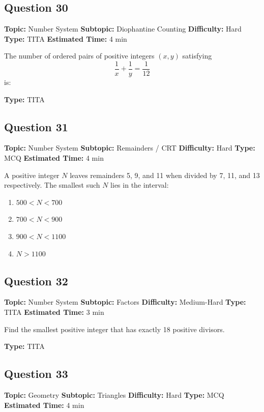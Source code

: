 \documentclass[11pt]{article}
\begin{document}
\subsection*{Question 30}
\textbf{Topic:} Number System \quad \textbf{Subtopic:} Diophantine Counting \quad \textbf{Difficulty:} Hard \quad \textbf{Type:} TITA \quad \textbf{Estimated Time:} 4 min

\begin{tcolorbox}
The number of ordered pairs of positive integers $(x, y)$ satisfying
\[ \frac{1}{x} + \frac{1}{y} = \frac{1}{12} \]
is:
\end{tcolorbox}
\textbf{Type:} TITA

\subsection*{Question 31}
\textbf{Topic:} Number System \quad \textbf{Subtopic:} Remainders / CRT \quad \textbf{Difficulty:} Hard \quad \textbf{Type:} MCQ \quad \textbf{Estimated Time:} 4 min

\begin{tcolorbox}
A positive integer $N$ leaves remainders 5, 9, and 11 when divided by 7, 11, and 13 respectively. The smallest such $N$ lies in the interval:
\end{tcolorbox}
\begin{enumerate}[label=(\Alph*)]
\item $500 < N < 700$
\item $700 < N < 900$
\item $900 < N < 1100$
\item $N > 1100$
\end{enumerate}

\subsection*{Question 32}
\textbf{Topic:} Number System \quad \textbf{Subtopic:} Factors \quad \textbf{Difficulty:} Medium-Hard \quad \textbf{Type:} TITA \quad \textbf{Estimated Time:} 3 min

\begin{tcolorbox}
Find the smallest positive integer that has exactly 18 positive divisors.
\end{tcolorbox}
\textbf{Type:} TITA

\subsection*{Question 33}
\textbf{Topic:} Geometry \quad \textbf{Subtopic:} Triangles \quad \textbf{Difficulty:} Hard \quad \textbf{Type:} MCQ \quad \textbf{Estimated Time:} 4 min
\end{document}
